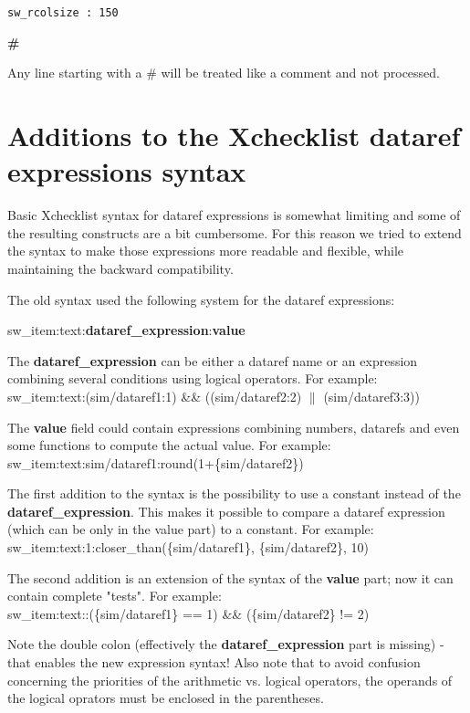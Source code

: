 \documentclass[11pt,parskip=half,a4paper]{scrartcl}
\newcommand\textstyleSourceText[1]{\texttt{#1}}
\begin{document}
\textstyleSourceText{sw\_rcolsize : 150}

{\bfseries
\#}

Any line starting with a \# will be treated like a comment and not processed. \newline


\newpage
\section{Additions to the Xchecklist dataref expressions syntax}

Basic Xchecklist syntax for dataref expressions is somewhat limiting and some of the resulting constructs are a bit cumbersome. For this reason we tried to extend the syntax to make those expressions more readable and flexible, while maintaining the backward compatibility.

The old syntax used the following system for the dataref expressions: \

sw\_item:text:\textbf{dataref\_expression}:\textbf{value}  \

The \textbf{dataref\_expression} can be either a dataref name or an expression combining several conditions using logical operators.
For example: \\

sw\_item:text:(sim/dataref1:1) \&\& ((sim/dataref2:2) $\|$ (sim/dataref3:3)) \

The \textbf{value} field could contain expressions combining numbers, datarefs and even some functions to compute the actual value.
For example: \\

sw\_item:text:sim/dataref1:round(1+\{sim/dataref2\}) \

The first addition to the syntax is the possibility to use a constant instead of the \textbf{dataref\_expression}. This makes it possible to compare a dataref expression (which can be only in the value part) to a constant.
For example: \\

sw\_item:text:1:closer\_than(\{sim/dataref1\}, \{sim/dataref2\}, 10) \

The second addition is an extension of the syntax of the \textbf{value} part; now it can contain complete "tests".
For example: \\

sw\_item:text::(\{sim/dataref1\} == 1) \&\& (\{sim/dataref2\} != 2) \

Note the double colon (effectively the \textbf{dataref\_expression} part is missing) - that enables the new expression syntax!
Also note that to avoid confusion concerning the priorities of the arithmetic vs. logical operators, the operands of the logical oprators must be enclosed in the parentheses.
\end{document}
